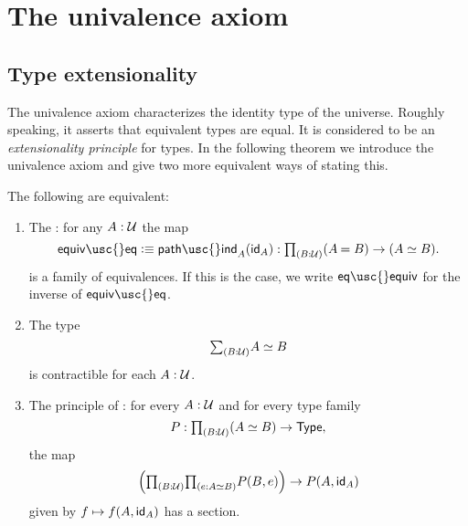 \chapter{The univalence axiom}

\section{Type extensionality}

The univalence axiom characterizes the identity type of the universe. Roughly speaking, it asserts that equivalent types are equal. It is considered to be an \emph{extensionality principle} for types. In the following theorem we introduce the univalence axiom and give two more equivalent ways of stating this.

\begin{thm}\label{thm:univalence}
The following are equivalent:
\begin{enumerate}
\item The : for any $A:\UU$ the map
\begin{equation*}
\mathsf{equiv\usc{}eq}\defeq \mathsf{path\usc{}ind}_A(\idfunc[A]) : \prd{B:\UU} (\id{A}{B})\to(\eqv{A}{B}).
\end{equation*}
is a family of equivalences. If this is the case, we write
$\mathsf{eq\usc{}equiv}$
for the inverse of $\mathsf{equiv\usc{}eq}$.
\item The type
\begin{equation*}
\sm{B:\UU}\eqv{A}{B}
\end{equation*}
is contractible for each $A:\UU$.
\item The principle of : for every $A:\UU$ and for every type family
\begin{equation*}
P:\prd{B:\UU} (\eqv{A}{B})\to \mathsf{Type},
\end{equation*}
the map
\begin{equation*}
\Big(\prd{B:\UU}{e:\eqv{A}{B}}P(B,e)\Big)\to P(A,\idfunc[A])
\end{equation*}
given by $f\mapsto f(A,\idfunc[A])$ has a section.
\end{enumerate}
\end{thm}


